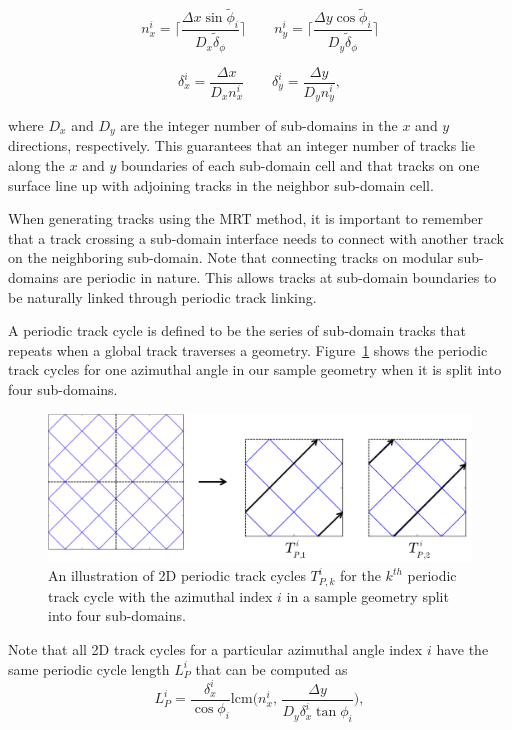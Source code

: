 \begin{equation}
n_x^i = \Bigg\lceil\frac{\Delta x\sin{\tilde{\phi}_i}}{D_x \tilde{\delta}_\phi}\Bigg\rceil \qquad n_y^i = \Bigg\lceil\frac{\Delta y \cos{\tilde{\phi}_i}}{D_y \tilde{\delta}_\phi} \Bigg\rceil
\label{eq:mrt-nx-ny}
\end{equation}

\begin{equation}
\delta_x^i = \frac{\Delta x}{D_x n_x^i} \qquad \delta_y^i = \frac{\Delta y}{D_y n_y^i},
\label{eq:mrt-dx-dy}
\end{equation}

\noindent
where $D_x$ and $D_y$ are the integer number of sub-domains in the $x$ and $y$ directions, respectively. This guarantees that an integer number of tracks lie along the $x$ and $y$ boundaries of each sub-domain cell and that tracks on one surface line up with adjoining tracks in the neighbor sub-domain cell. 

When generating tracks using the \ac{MRT} method, it is important to remember that a track crossing a sub-domain interface needs to connect with another track on the neighboring sub-domain. Note that connecting tracks on modular sub-domains are periodic in nature. This allows tracks at sub-domain boundaries to be naturally linked through periodic track linking.

A periodic track cycle is defined to be the series of sub-domain tracks that repeats when a global track traverses a geometry. Figure~\ref{fig:periodic-cycles} shows the periodic track cycles for one azimuthal angle in our sample geometry when it is split into four sub-domains.

\begin{figure}[h]
	\centering
	\includegraphics[width=5in]{figures/laydown/2d_periodic_track_cycles_2.png}
	\caption{An illustration of 2D periodic track cycles $T_{P,k}^i$ for the $k^{th}$ periodic track cycle with the azimuthal index $i$ in a sample geometry split into four sub-domains.}
	\label{fig:periodic-cycles}
\end{figure}
Note that all 2D track cycles for a particular azimuthal angle index $i$ have the same periodic cycle length $L_P^{i}$ that can be computed as
\begin{equation}
L_P^i = \frac{\delta_x^i}{\cos{\phi_i}}  \text{lcm} \bigg( n_x^i, \,  \frac{\Delta y}{D_y \delta_x^i \tan{\phi_i}} \bigg),
\label{eq:period-cycle-len}
\end{equation}

